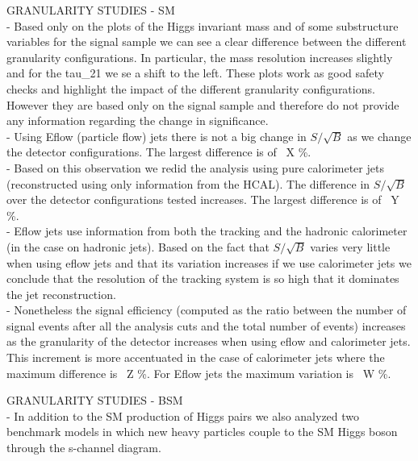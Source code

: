 GRANULARITY STUDIES - SM\\
- Based only on the plots of the Higgs invariant mass and of some substructure variables for the signal sample we can see a clear difference between the different granularity configurations. In particular, the mass resolution increases slightly and for the tau\_21 we se a shift to the left. These plots work as good safety checks and highlight the impact of the different granularity configurations. However they are based only on the signal sample and therefore do not provide any information regarding the change in significance. \\
- Using Eflow (particle flow) jets there is not a big change in $S/\sqrt{B}$ as we change the detector configurations. The largest difference is of ~X \%. \\
- Based on this observation we redid the analysis using pure calorimeter jets (reconstructed using only information from the HCAL). The difference in $S/\sqrt{B}$ over the detector configurations tested increases. The largest difference is of ~Y \%. \\
- Eflow jets use information from both the tracking and the hadronic calorimeter (in the case on hadronic jets). Based on the fact that $S/\sqrt{B}$ varies very little when using eflow jets and that its variation increases if we use calorimeter jets we conclude that the resolution of the tracking system is so high that it dominates the jet reconstruction.\\
- Nonetheless the signal efficiency (computed as the ratio between the number of signal events after all the analysis cuts and the total number of events) increases as the granularity of the detector increases when using eflow and calorimeter jets. This increment is more accentuated in the case of calorimeter jets where the maximum difference is ~Z \%. For Eflow jets the maximum variation is ~W \%. \\
\newline

GRANULARITY STUDIES - BSM\\
- In addition to the SM production of Higgs pairs we also analyzed two benchmark models in which new heavy particles couple to the SM Higgs boson through the s-channel diagram.
